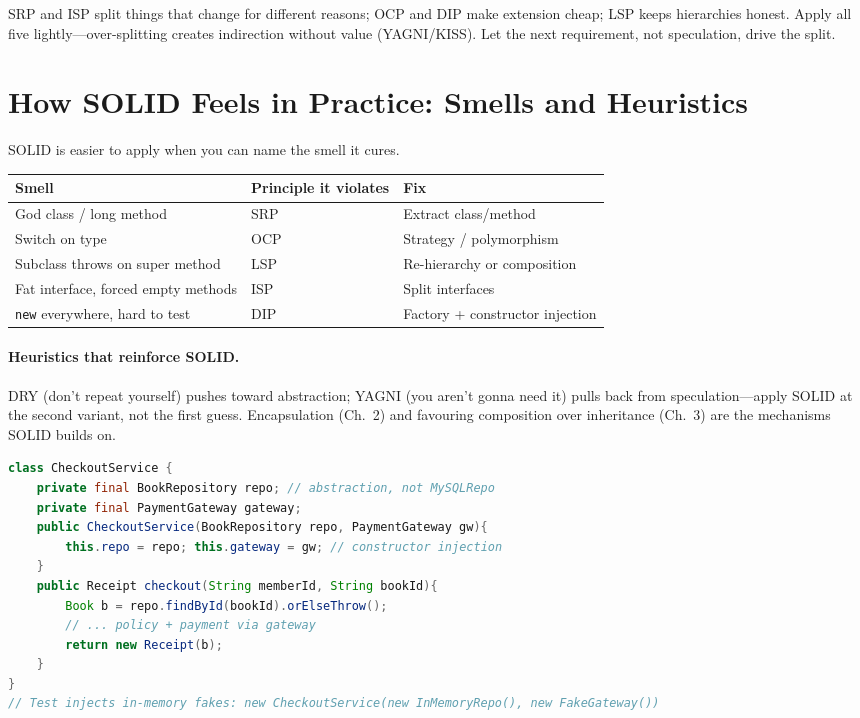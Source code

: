 \begin{remark}
SRP and ISP split things that change for different reasons; OCP and DIP make extension cheap; LSP keeps hierarchies honest. Apply all five lightly---over-splitting creates indirection without value (YAGNI/KISS). Let the next requirement, not speculation, drive the split.
\end{remark}

\section{How SOLID Feels in Practice: Smells and Heuristics}
\label{sec:solid-practice}
SOLID is easier to apply when you can name the smell it cures.

\begin{center}
\small
\begin{tabular}{lll}
\toprule
Smell & Principle it violates & Fix \\
\midrule
God class / long method & SRP & Extract class/method \\
Switch on type & OCP & Strategy / polymorphism \\
Subclass throws on super method & LSP & Re-hierarchy or composition \\
Fat interface, forced empty methods & ISP & Split interfaces \\
\texttt{new} everywhere, hard to test & DIP & Factory + constructor injection \\
\bottomrule
\end{tabular}
\end{center}

\paragraph{Heuristics that reinforce SOLID.} DRY (don't repeat yourself) pushes toward abstraction; YAGNI (you aren't gonna need it) pulls back from speculation---apply SOLID at the second variant, not the first guess. Encapsulation (Ch.~2) and favouring composition over inheritance (Ch.~3) are the mechanisms SOLID builds on.

\begin{lstlisting}[language=Java, caption={DIP + injection makes testing trivial (preview of Ch.~8).}]
class CheckoutService {
    private final BookRepository repo; // abstraction, not MySQLRepo
    private final PaymentGateway gateway;
    public CheckoutService(BookRepository repo, PaymentGateway gw){
        this.repo = repo; this.gateway = gw; // constructor injection
    }
    public Receipt checkout(String memberId, String bookId){
        Book b = repo.findById(bookId).orElseThrow();
        // ... policy + payment via gateway
        return new Receipt(b);
    }
}
// Test injects in-memory fakes: new CheckoutService(new InMemoryRepo(), new FakeGateway())
\end{lstlisting}

